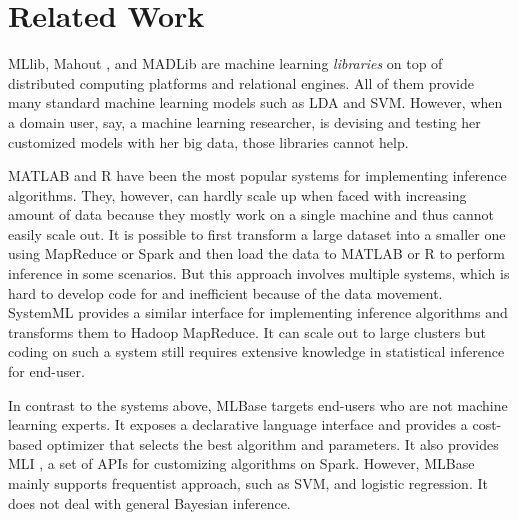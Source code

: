 
\section{Related Work}
\label{sec:related}

MLlib, Mahout \cite{mahout}, and MADLib \cite{madlib} are machine learning \emph{libraries} on top of distributed computing platforms and relational engines.
All of them provide many standard machine learning models such as LDA and SVM.
However, when a domain user, say, a machine learning researcher, 
is devising and testing her customized models with her big data, 
those libraries cannot help.

MATLAB and R have been the most popular systems for implementing inference algorithms.
They, however, can hardly scale up when faced with increasing amount of data
because they mostly work on a single machine and thus cannot easily scale out.
It is possible to first transform a large dataset into a smaller one
using MapReduce or Spark and then load the data to MATLAB or R to perform inference %
in some scenarios. But this approach involves multiple systems, which is hard to
develop code for and inefficient because of the data movement.
SystemML \cite{systemml} provides a similar interface for implementing inference
algorithms and transforms them to Hadoop MapReduce. It can scale out to large
clusters but coding on such a system still requires extensive knowledge in
statistical inference for end-user. 

In contrast to the systems above, MLBase \cite{mlbase} targets end-users who are not
machine learning experts. It exposes a declarative language interface and
provides a cost-based optimizer that selects the best algorithm and
parameters. It also provides MLI \cite{mli}, a set of APIs for customizing algorithms on
Spark. However, MLBase mainly supports frequentist approach, such as SVM,
and logistic regression. It does not deal with general Bayesian inference. 

